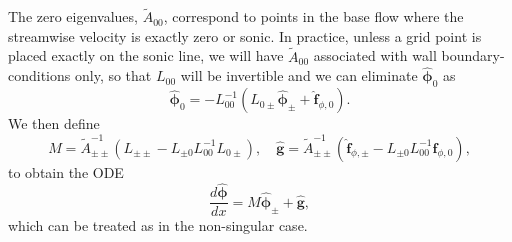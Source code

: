 The zero eigenvalues, $\tilde{A}_{00}$, correspond to points in the base flow where the streamwise velocity is exactly zero or sonic. In practice, unless a grid point is placed exactly on the sonic line, we will have $\tilde{A}_{00}$ associated with wall boundary-conditions only, so that $L_{00}$ will be invertible and we can eliminate $\hat{\bm{\phi}}_0$ as
\begin{equation}
    \hat{\bm{\phi}}_0=-L_{00}^{-1}(L_{0\pm}\hat{\bm{\phi}}_{\pm}+\hat{\bm{f}}_{\phi,0}).
\end{equation}
We then define
\begin{equation}
    M=\tilde{A}_{\pm\pm}^{-1}(L_{\pm\pm}-L_{\pm0}L_{00}^{-1}L_{0\pm}),\quad \hat{\bm{g}}=\tilde{A}_{\pm\pm}^{-1}(\hat{\bm{f}}_{\phi,\pm}-L_{\pm0}L_{00}^{-1}\hat{\bm{f}}_{\phi,0}),
    \end{equation}
to obtain the ODE
\begin{equation}
    \frac{d\hat{\bm{\phi}}}{d x}=M\hat{\bm{\phi}}_{\pm}+\hat{\bm{g}},
\end{equation}
which can be treated as in the non-singular case.